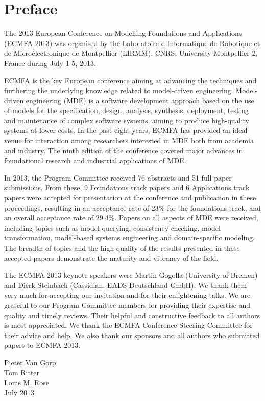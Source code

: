 
\chapter*{Preface}
The 2013 European Conference on Modelling Foundations and Applications (ECMFA 2013) was organised by the Laboratoire d'Informatique de Robotique et de Micro\'{e}lectronique de Montpellier (LIRMM), CNRS, University Montpellier 2, France during July 1-5, 2013.

ECMFA is the key European conference aiming at advancing the techniques and furthering the underlying knowledge related to model-driven engineering. Model-driven engineering (MDE) is a software development approach based on the use of models for the specification, design, analysis, synthesis, deployment, testing and maintenance of complex software systems, aiming to produce high-quality systems at lower costs. In the past eight years, ECMFA has provided an ideal venue for interaction among researchers interested in MDE both from academia and industry. The ninth edition of the conference covered major advances in foundational research and industrial applications of MDE.

In 2013, the Program Committee received 76 abstracts and 51 full paper submissions. From these, 9 Foundations track papers and 6 Applications track papers were accepted for presentation at the conference and publication in these proceedings, resulting in an acceptance rate of 23\% for the foundations track, and an overall acceptance rate of 29.4\%. Papers on all aspects of MDE were received, including topics such as model querying, consistency checking, model transformation, model-based systems engineering and domain-specific modeling. The breadth of topics and the high quality of the results presented in these accepted papers demonstrate the maturity and vibrancy of the field.

The ECMFA 2013 keynote speakers were Martin Gogolla (University of Bremen) and Dierk Steinbach (Cassidian, EADS Deutschland GmbH). We thank them very much for accepting our invitation and for their enlightening talks. We are grateful to our Program Committee members for providing their expertise and quality and timely reviews. Their helpful and constructive feedback to all authors is most appreciated. We thank the ECMFA Conference Steering Committee for their advice and help. We also thank our sponsors and all authors who submitted papers to ECMFA 2013.

\vspace{1cm}
\begin{flushright}\noindent
Pieter Van Gorp \\
Tom Ritter \\
Louis M. Rose \\
$ $ \\
July 2013
\end{flushright}